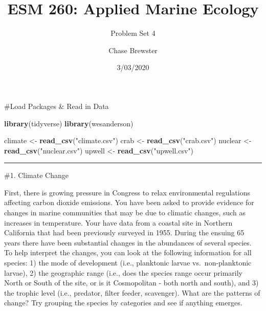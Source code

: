 \documentclass[]{article}
\title{ESM 260: Applied Marine Ecology}
\subtitle{Problem Set 4}
\author{Chase Brewster}
\date{3/03/2020}
\newenvironment{Shaded}{\begin{snugshade}}{\end{snugshade}}
\newcommand{\KeywordTok}[1]{\textcolor[rgb]{0.13,0.29,0.53}{\textbf{#1}}}
\newcommand{\NormalTok}[1]{#1}
\newcommand{\StringTok}[1]{\textcolor[rgb]{0.31,0.60,0.02}{#1}}
\begin{document}
\maketitle

\#Load Packages \& Read in Data

\begin{Shaded}
\begin{Highlighting}[]
\KeywordTok{library}\NormalTok{(tidyverse)}
\KeywordTok{library}\NormalTok{(wesanderson)}

\NormalTok{climate <-}\StringTok{ }\KeywordTok{read_csv}\NormalTok{(}\StringTok{"climate.csv"}\NormalTok{)}
\NormalTok{crab <-}\StringTok{ }\KeywordTok{read_csv}\NormalTok{(}\StringTok{"crab.csv"}\NormalTok{)}
\NormalTok{nuclear <-}\StringTok{ }\KeywordTok{read_csv}\NormalTok{(}\StringTok{"nuclear.csv"}\NormalTok{)}
\NormalTok{upwell <-}\StringTok{ }\KeywordTok{read_csv}\NormalTok{(}\StringTok{"upwell.csv"}\NormalTok{)}
\end{Highlighting}
\end{Shaded}

\begin{center}\rule{0.5\linewidth}{\linethickness}\end{center}

\#1. Climate Change

First, there is growing pressure in Congress to relax environmental
regulations affecting carbon dioxide emissions. You have been asked to
provide evidence for changes in marine communities that may be due to
climatic changes, such as increases in temperature. Your have data from
a coastal site in Northern California that had been previously surveyed
in 1955. During the ensuing 65 years there have been substantial changes
in the abundances of several species. To help interpret the changes, you
can look at the following information for all species: 1) the mode of
development (i.e., planktonic larvae vs.~non-planktonic larvae), 2) the
geographic range (i.e., does the species range occur primarily North or
South of the site, or is it Cosmopolitan - both north and south), and 3)
the trophic level (i.e., predator, filter feeder, scavenger). What are
the patterns of change? Try grouping the species by categories and see
if anything emerges.
\end{document}
